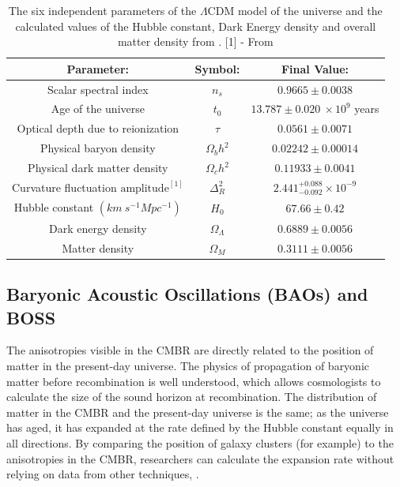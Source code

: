 \documentclass[12pt]{report}
\begin{document}
\setlength{\arrayrulewidth}{0.2mm} %

\setlength{\tabcolsep}{8pt} %

\renewcommand{\arraystretch}{1.1} %

\begin{table}[h!]
    \centering
    \begin{tabular}{|c|c|c|}
\hline
        \textbf{Parameter:} & \textbf{Symbol:} & \textbf{Final Value:}\\
\hline
\hline
        Scalar spectral index & $n_{s}$ & $0.9665 \pm 0.0038$ \\
\hline
        Age of the universe & $t_{0}$ & $13.787 \pm 0.020 \ \times 10^{9}$ years \\
\hline
        Optical depth due to reionization & $\tau$ & $0.0561 \pm 0.0071$ \\
\hline
        Physical baryon density & $\Omega_{b}h^{2}$ & $0.02242 \pm 0.00014$ \\
\hline 
        Physical dark matter density & $\Omega_{c}h^{2}$ & $0.11933 \pm 0.0041$ \\
\hline
        Curvature fluctuation $\text{amplitude}^{[1]}$ & $\Delta^{2}_{R}$ & $2.441^{+0.088}_{-0.092} \times 10^{-9}$\\ 
\hline
        Hubble constant $(km \ s^{-1}Mpc^{-1})$ & $H_{0}$ & $67.66 \pm 0.42$ \\
\hline
        Dark energy density & $\Omega_{\Lambda}$ & $0.6889 \pm 0.0056$ \\
\hline
        Matter density & $\Omega_{M}$ & $0.3111 \pm 0.0056 $ \\
\hline
    \end{tabular}
    \caption{The six independent parameters of the $\Lambda$CDM model of the universe and the calculated values of the Hubble constant, Dark Energy density and overall matter density from \textcite{Aghanim2020}. [1] - From \textcite{Jarosik2011}} 
    \label{tab:my_label}
\end{table}

\subsection{Baryonic Acoustic Oscillations (BAOs) and BOSS}

The anisotropies visible in the CMBR are directly related to the position of matter in the present-day universe. The physics of propagation of baryonic matter before recombination is well understood, which allows cosmologists to calculate the size of the sound horizon at recombination. The distribution of matter in the CMBR and the present-day universe is the same; as the universe has aged, it has expanded at the rate defined by the Hubble constant equally in all directions. By comparing the position of galaxy clusters (for example) to the anisotropies in the CMBR, researchers can calculate the expansion rate without relying on data from other techniques, \textcite{Eisenstein2005}.
\end{document}
